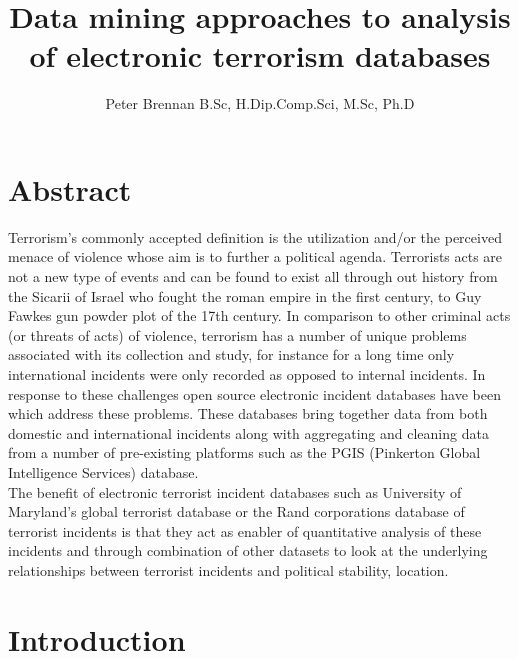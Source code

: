 \documentclass[11pt,twocolumn]{article}
\title{Data mining approaches to analysis of electronic terrorism databases}
\author{Peter Brennan B.Sc, H.Dip.Comp.Sci, M.Sc, Ph.D}
\begin{document}
\maketitle
\section*{\textbf{Abstract}} 
Terrorism's commonly accepted definition is the utilization and/or the perceived menace of violence whose aim is to further a political agenda. Terrorists acts are not a new type of events and can be found to exist all through out history from the Sicarii of Israel who fought the roman empire in the first century, to Guy Fawkes gun powder plot of the 17th century.
In comparison to other criminal acts (or threats of acts) of violence, terrorism  has a number of unique problems associated with its collection and study, for instance for a long time only international incidents were only recorded as opposed to internal incidents. In response to these challenges open source electronic incident databases have been  which address these problems. These databases bring together data from both domestic and international incidents along with aggregating and cleaning data from a number of pre-existing platforms such as the PGIS (Pinkerton Global Intelligence Services) database.
\\
The benefit of electronic terrorist incident databases such as University of Maryland's global terrorist database or the Rand corporations database of terrorist incidents is that they act as enabler of quantitative analysis of these incidents and through combination of other datasets to look at the underlying relationships between terrorist incidents and political stability, location. 
\section*{\textbf{Introduction}}
\end{document}
